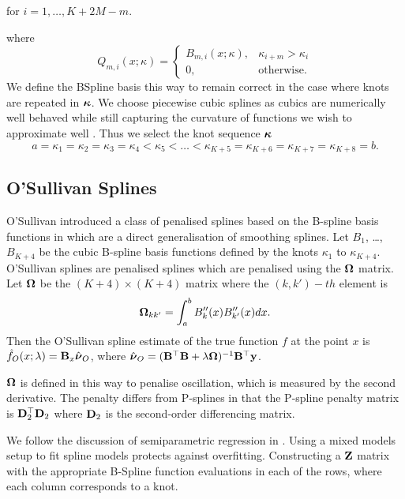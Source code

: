 \noindent for $i = 1, \ldots, K + 2 M - m$.

\noindent where
$$
Q_{m, i}(x; \kappa) =
\begin{cases}
B_{m, i}(x; \kappa),& \kappa_{i + m} > \kappa_i \\
0, & \text{otherwise}.
\end{cases}
$$
We define the BSpline basis this way to remain correct in the case where knots are repeated in ${\boldsymbol \kappa}$. We
choose piecewise cubic splines as cubics are numerically well behaved while still capturing the curvature of
functions we wish to approximate well \citep{Press:2007:NRE:1403886}. Thus we select the knot sequence
${\boldsymbol \kappa}$
$$
a = \kappa_1 = \kappa_2 = \kappa_3 = \kappa_4 < \kappa_5 < \ldots < \kappa_{K+5} = \kappa_{K+6} = \kappa_{K+7} = \kappa_{K+8} = b.
$$

\subsection{O'Sullivan Splines}

O'Sullivan introduced a class of penalised splines based on the B-spline basis functions in
\cite{OSullivan1986} which are a direct generalisation of smoothing splines. Let $B_1$, \ldots, $B_{K+4}$ be
the cubic B-spline basis functions defined by the knots $\kappa_1$ to $\kappa_{K+4}$. O'Sullivan splines are
penalised splines which are penalised using the ${\boldsymbol \Omega}$ matrix. Let ${\boldsymbol \Omega}$ be the $(K+4) \times (K+4)$
matrix where the $(k, k')-th$ element is \[   {\boldsymbol \Omega}_{k k'} = \int_a^b B''_k(x) B''_{k'}(x) dx. \] Then the
O'Sullivan spline estimate of the true function $f$ at the point $x$ is $\hat{f}_O(x; \lambda) = {\bf B}_x
\hat{{\boldsymbol \nu}}_O$, where $\hat{{\boldsymbol \nu}}_O = ({\bf B}^\top {\bf B} + \lambda {\boldsymbol\Omega})^{-1} {\bf B}^\top {\bf y}$.

${\boldsymbol \Omega}$ is defined in this way to penalise oscillation, which is measured by the second derivative.
The penalty differs from P-splines in that the P-spline penalty matrix is ${\bf D}_2^\top {\bf D}_2$ where ${\bf D}_2$ is
the second-order differencing matrix.

We follow the discussion of semiparametric regression in \cite{ruppert_wand_carroll_2003}.
Using a mixed models setup to fit spline models protects against overfitting.
Constructing a ${\bf Z}$ matrix with the appropriate B-Spline function evaluations in each of the rows, where
each column corresponds to a knot.

